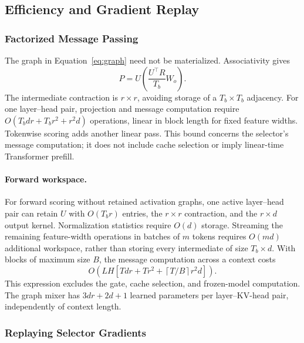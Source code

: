 \subsection{Efficiency and Gradient Replay}
\label{app:efficiency}

\subsubsection{Factorized Message Passing}
\label{app:factorized}

The graph in Equation~\ref{eq:graph} need not be materialized. Associativity gives
\begin{equation}
    P=U\left(\frac{U^{\top}R}{T_b}W_o\right).
    \label{eq:factorized}
\end{equation}
The intermediate contraction is $r\times r$, avoiding storage of a $T_b\times T_b$ adjacency. For one layer--head pair, projection and message computation require $O(T_bdr+T_br^2+r^2d)$ operations, linear in block length for fixed feature widths. Tokenwise scoring adds another linear pass. This bound concerns the selector's message computation; it does not include cache selection or imply linear-time Transformer prefill.

\paragraph{Forward workspace.}
For forward scoring without retained activation graphs, one active layer--head pair can retain $U$ with $O(T_br)$ entries, the $r\times r$ contraction, and the $r\times d$ output kernel. Normalization statistics require $O(d)$ storage. Streaming the remaining feature-width operations in batches of $m$ tokens requires $O(md)$ additional workspace, rather than storing every intermediate of size $T_b\times d$. With blocks of maximum size $B$, the message computation across a context costs
\begin{equation}
    O\!\left(LH\left[Tdr+Tr^2+\left\lceil T/B\right\rceil r^2d\right]\right).
\end{equation}
This expression excludes the gate, cache selection, and frozen-model computation. The graph mixer has $3dr+2d+1$ learned parameters per layer--KV-head pair, independently of context length.

\subsubsection{Replaying Selector Gradients}
\label{app:replay}

